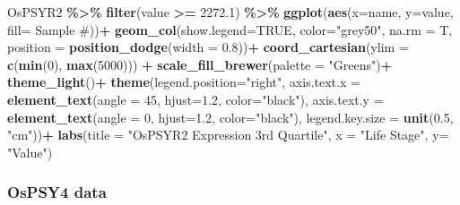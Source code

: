 \documentclass[
]{article}
\newenvironment{Shaded}{\begin{snugshade}}{\end{snugshade}}
\newcommand{\AttributeTok}[1]{\textcolor[rgb]{0.13,0.29,0.53}{#1}}
\newcommand{\ConstantTok}[1]{\textcolor[rgb]{0.56,0.35,0.01}{#1}}
\newcommand{\DecValTok}[1]{\textcolor[rgb]{0.00,0.00,0.81}{#1}}
\newcommand{\FloatTok}[1]{\textcolor[rgb]{0.00,0.00,0.81}{#1}}
\newcommand{\FunctionTok}[1]{\textcolor[rgb]{0.13,0.29,0.53}{\textbf{#1}}}
\newcommand{\NormalTok}[1]{#1}
\newcommand{\SpecialCharTok}[1]{\textcolor[rgb]{0.81,0.36,0.00}{\textbf{#1}}}
\newcommand{\StringTok}[1]{\textcolor[rgb]{0.31,0.60,0.02}{#1}}
\begin{document}
\begin{Shaded}
\begin{Highlighting}[]
\NormalTok{OsPSYR2 }\SpecialCharTok{\%\textgreater{}\%} 
  \FunctionTok{filter}\NormalTok{(value }\SpecialCharTok{\textgreater{}=} \FloatTok{2272.1}\NormalTok{) }\SpecialCharTok{\%\textgreater{}\%} 
  \FunctionTok{ggplot}\NormalTok{(}\FunctionTok{aes}\NormalTok{(}\AttributeTok{x=}\NormalTok{name, }\AttributeTok{y=}\NormalTok{value, }\AttributeTok{fill=} \StringTok{\textasciigrave{}}\AttributeTok{Sample \#}\StringTok{\textasciigrave{}}\NormalTok{))}\SpecialCharTok{+}
  \FunctionTok{geom\_col}\NormalTok{(}\AttributeTok{show.legend=}\ConstantTok{TRUE}\NormalTok{, }\AttributeTok{color=}\StringTok{"grey50"}\NormalTok{, }\AttributeTok{na.rm =}\NormalTok{ T, }\AttributeTok{position =} \FunctionTok{position\_dodge}\NormalTok{(}\AttributeTok{width =} \FloatTok{0.8}\NormalTok{))}\SpecialCharTok{+}
  \FunctionTok{coord\_cartesian}\NormalTok{(}\AttributeTok{ylim =} \FunctionTok{c}\NormalTok{(}\FunctionTok{min}\NormalTok{(}\DecValTok{0}\NormalTok{), }\FunctionTok{max}\NormalTok{(}\DecValTok{5000}\NormalTok{))) }\SpecialCharTok{+}
  \FunctionTok{scale\_fill\_brewer}\NormalTok{(}\AttributeTok{palette =} \StringTok{"Greens"}\NormalTok{)}\SpecialCharTok{+}
  \FunctionTok{theme\_light}\NormalTok{()}\SpecialCharTok{+}
  \FunctionTok{theme}\NormalTok{(}\AttributeTok{legend.position=}\StringTok{"right"}\NormalTok{, }
        \AttributeTok{axis.text.x =} \FunctionTok{element\_text}\NormalTok{(}\AttributeTok{angle =} \DecValTok{45}\NormalTok{, }\AttributeTok{hjust=}\FloatTok{1.2}\NormalTok{, }\AttributeTok{color=}\StringTok{"black"}\NormalTok{), }
        \AttributeTok{axis.text.y =} \FunctionTok{element\_text}\NormalTok{(}\AttributeTok{angle =} \DecValTok{0}\NormalTok{, }\AttributeTok{hjust=}\FloatTok{1.2}\NormalTok{, }\AttributeTok{color=}\StringTok{"black"}\NormalTok{), }
        \AttributeTok{legend.key.size =} \FunctionTok{unit}\NormalTok{(}\FloatTok{0.5}\NormalTok{, }\StringTok{"cm"}\NormalTok{))}\SpecialCharTok{+}
  \FunctionTok{labs}\NormalTok{(}\AttributeTok{title =} \StringTok{"OsPSYR2 Expression 3rd Quartile"}\NormalTok{,}
       \AttributeTok{x =} \StringTok{"Life Stage"}\NormalTok{,}
       \AttributeTok{y=} \StringTok{"Value"}\NormalTok{)}
\end{Highlighting}
\end{Shaded}

\subsubsection{OsPSY4 data}\label{ospsy4-data}
\end{document}
